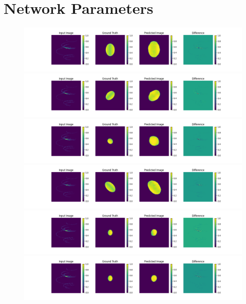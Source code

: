 \section{Network Parameters}
\begin{figure}
	\centering
	\includegraphics[width=\linewidth]{fig/testing_image/image_3.png}
	\includegraphics[width=\linewidth]{fig/testing_image/image_14.png}
	\includegraphics[width=\linewidth]{fig/testing_image/image_15.png}
	\includegraphics[width=\linewidth]{fig/testing_image/image_18.png}
	\includegraphics[width=\linewidth]{fig/testing_image/image_42.png}
	\includegraphics[width=\linewidth]{fig/testing_image/image_47.png}

\end{figure}
